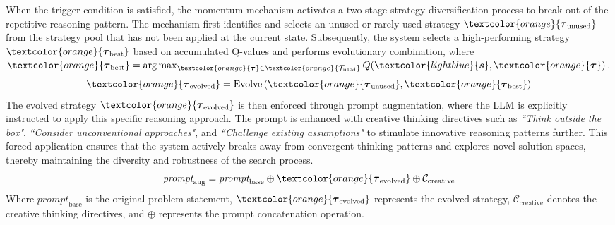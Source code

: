 \documentclass[11pt]{article}
\theoremstyle{definition}
\theoremstyle{remark}
\begin{document}
When the trigger condition is satisfied, the momentum mechanism activates a two-stage strategy diversification process to break out of the repetitive reasoning pattern. The mechanism first identifies and selects an unused or rarely used strategy $\textcolor{orange}{\boldsymbol{\tau}_{\text{unused}}}$ from the strategy pool that has not been applied at the current state. Subsequently, the system selects a high-performing strategy $\textcolor{orange}{\boldsymbol{\tau}_{\text{best}}}$ based on accumulated Q-values and performs evolutionary combination, where $\textcolor{orange}{\boldsymbol{\tau}_{\text{best}}} = \arg\max_{\textcolor{orange}{\boldsymbol{\tau}} \in \textcolor{orange}{\mathcal{T}_{\text{used}}}} Q(\textcolor{lightblue}{\boldsymbol{s}}, \textcolor{orange}{\boldsymbol{\tau}})$.
\begin{equation}
\textcolor{orange}{\boldsymbol{\tau}_{\text{evolved}}} = \text{Evolve}\left(\textcolor{orange}{\boldsymbol{\tau}_{\text{unused}}}, \textcolor{orange}{\boldsymbol{\tau}_{\text{best}}}\right)
\end{equation}
The evolved strategy $\textcolor{orange}{\boldsymbol{\tau}_{\text{evolved}}}$ is then enforced through prompt augmentation, where the LLM is explicitly instructed to apply this specific reasoning approach. The prompt is enhanced with creative thinking directives such as \textit{``Think outside the box"}, \textit{``Consider unconventional approaches"}, and \textit{``Challenge existing assumptions"} to stimulate innovative reasoning patterns further. This forced application ensures that the system actively breaks away from convergent thinking patterns and explores novel solution spaces, thereby maintaining the diversity and robustness of the search process.
\begin{equation}
\label{eq:augmented_prompt_v4}
\textit{prompt}_{\text{aug}} = \textit{prompt}_{\text{base}} \oplus \textcolor{orange}{\boldsymbol{\tau}_{\text{evolved}}}\oplus \mathcal{C}_{\text{creative}} 
\end{equation}
Where $\textit{prompt}_{\text{base}}$ is the original problem statement, $\textcolor{orange}{\boldsymbol{\tau}_{\text{evolved}}}$ represents the evolved strategy, $\mathcal{C}_{\text{creative}}$ denotes the creative thinking directives, and $\oplus$ represents the prompt concatenation operation.
\end{document}
